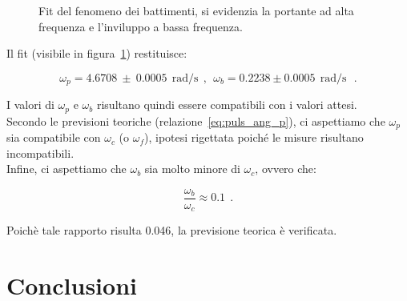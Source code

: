 \documentclass[a4paper,12pt]{article}
\begin{document}
\begin{figure}
    \centering
    \resizebox{0.95\textwidth}{!}{%
        
    }
    \caption{Fit del fenomeno dei battimenti, si evidenzia la portante ad alta frequenza e l'inviluppo a bassa frequenza.}%
    \label{fig:Figura4}
\end{figure}

Il fit (visibile in figura~\ref{fig:Figura4}) restituisce:

\[
    \omega_p = 4.6708 \ \pm \ 0.0005 \ \ \text{rad/s} \ \ , \ \ \omega_b = 0.2238 \pm 0.0005 \ \ \text{rad/s} \ \ \ .
\]

I valori di $\omega_p$ e $\omega_b$ risultano quindi essere compatibili con i valori attesi.
\\
Secondo le previsioni teoriche (relazione~\ref{eq:puls_ang_p}), ci aspettiamo che $\omega_p$ sia compatibile con $\omega_c$ (o $\omega_f$), ipotesi rigettata poiché le misure risultano incompatibili.
\\
Infine, ci aspettiamo che $\omega_b$ sia molto minore di $\omega_c$, ovvero che:

\[
    \frac{\omega_b}{\omega_c} \approx 0.1 \ \ .
\]

Poichè tale rapporto risulta 0.046, la previsione teorica è verificata.


\section{Conclusioni}
\end{document}
